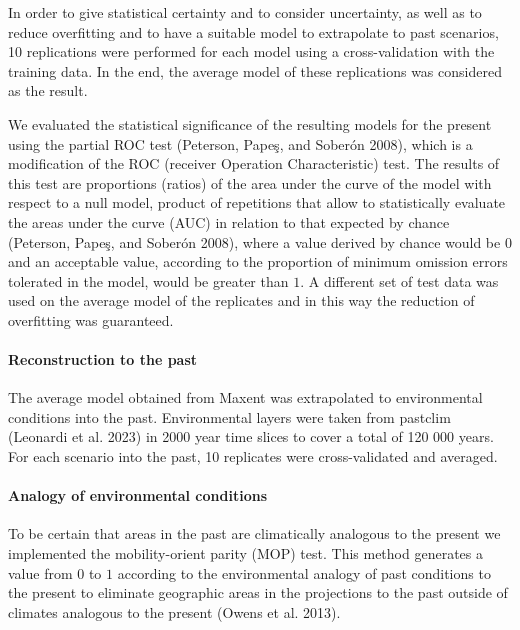 \documentclass[
]{article}
\begin{document}
In order to give statistical certainty and to consider uncertainty, as
well as to reduce overfitting and to have a suitable model to
extrapolate to past scenarios, 10 replications were performed for each
model using a cross-validation with the training data. In the end, the
average model of these replications was considered as the result.

We evaluated the statistical significance of the resulting models for
the present using the partial ROC test (Peterson, Papeş, and Soberón
2008), which is a modification of the ROC (receiver Operation
Characteristic) test. The results of this test are proportions (ratios)
of the area under the curve of the model with respect to a null model,
product of repetitions that allow to statistically evaluate the areas
under the curve (AUC) in relation to that expected by chance (Peterson,
Papeş, and Soberón 2008), where a value derived by chance would be \(0\)
and an acceptable value, according to the proportion of minimum omission
errors tolerated in the model, would be greater than \(1\). A different
set of test data was used on the average model of the replicates and in
this way the reduction of overfitting was guaranteed.

\hypertarget{reconstruction-to-the-past}{%
\paragraph{Reconstruction to the
past}\label{reconstruction-to-the-past}}

The average model obtained from Maxent was extrapolated to environmental
conditions into the past. Environmental layers were taken from pastclim
(Leonardi et al. 2023) in 2000 year time slices to cover a total of 120
000 years. For each scenario into the past, 10 replicates were
cross-validated and averaged.

\hypertarget{analogy-of-environmental-conditions}{%
\paragraph{Analogy of environmental
conditions}\label{analogy-of-environmental-conditions}}

To be certain that areas in the past are climatically analogous to the
present we implemented the mobility-orient parity (MOP) test. This
method generates a value from \(0\) to \(1\) according to the
environmental analogy of past conditions to the present to eliminate
geographic areas in the projections to the past outside of climates
analogous to the present (Owens et al. 2013).
\end{document}
